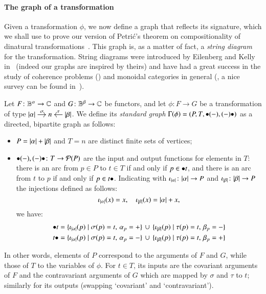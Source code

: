 \paragraph{The graph of a transformation} Given a transformation $\phi$, we now define a graph that reflects its signature, which we shall use to prove our version of Petri\'c's theorem on compositionality of dinatural transformations~\cite{petric_g-dinaturality_2003}. This graph is, as a matter of fact, a \emph{string diagram} for the transformation. String diagrams were introduced by Eilenberg and Kelly in~\cite{eilenberg_generalization_1966} (indeed our graphs are inspired by theirs) and have had a great success in the study of coherence problems (\cite{kelly_coherence_1980,mac_lane_natural_1963}) and monoidal categories in general (\cite{joyal_geometry_1991,joyal_traced_1996}, a nice survey can be found in~\cite{selinger_survey_2010}).

\begin{definition}\label{def:standard graph}
	Let $F \colon \mathbb B^\alpha \to \mathbb C$ and $G \colon \mathbb B^\beta \to \mathbb C$ be functors, and let $\phi \colon F \to G$ be a transformation of type
	$
	\begin{tikzcd}[cramped,sep=small]
	\length\alpha \ar[r,"\sigma"] & n & \ar[l,"\tau"'] \length\beta
	\end{tikzcd}
	$. We define its \emph{standard graph} $\graph\phi = (P,T,\inp{(-)},\out{(-)})$ as a directed, bipartite graph as follows:
	\begin{itemize}
		\item $P=\lvert \alpha \rvert + \lvert \beta \rvert$ and $T=n$ are distinct finite sets of vertices;
		\item $\inp{(-)},\out{(-)} \colon T \to \parts P$ are the input and output functions for elements in $T$: there is an arc from $p \in P$ to $t \in T$ if and only if $p \in \inp t$, and there is an arc from $t$ to $p$ if and only if $p \in \out t$. Indicating with $\iota_{\lvert \alpha \rvert} \colon \lvert \alpha \rvert \to P$ and $\iota_{\lvert \beta \rvert} \colon \lvert \beta \rvert \to P$ the injections defined as follows:
		\[
		\iota_{\lvert \alpha \rvert} (x) = x, \quad \iota_{\lvert \beta \rvert} (x) = \lvert \alpha \rvert + x,
		\]
		we have:
		\begin{align*}
		\inp{t}  &=
		\{ \injP {\length\alpha} (p) \mid \sigma (p) = t,\, \alpha_p = +  \} \, \cup \, \{ \injP {\length\beta} (p) \mid \tau (p) = t,\, \beta_p = -  \} \\
		\out{t} &= 
		\{ \injP {\length\alpha} (p) \mid \sigma(p) = t,\, \alpha_p = -  \} \, \cup
		\, \{ \injP {\length\beta} (p) \mid \tau (p) = t,\, \beta_p = +  \}
		\end{align*}
	\end{itemize}
	In other words, elements of $P$ correspond to the arguments of $F$ and $G$, while those of $T$ to the variables of $\phi$. For $t \in T$, its inputs are the covariant arguments of $F$ and the contravariant arguments of $G$ which are mapped by $\sigma$ and $\tau$ to $t$; similarly for its outputs (swapping `covariant' and `contravariant').
\end{definition}

